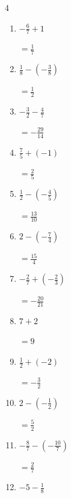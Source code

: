 \begin{multicols}{4}
\begin{enumerate}
        $\displaystyle =\frac{17}{10}$

  \item $\displaystyle -\frac{6}{7} + 1$

        $\displaystyle =\frac{1}{7}$

  \item $\displaystyle \frac{1}{8} - \left(-\frac{3}{8}\right)$

        $\displaystyle =\frac{1}{2}$

  \item $\displaystyle -\frac{3}{2} - \frac{4}{7}$

        $\displaystyle =-\frac{29}{14}$

  \item $\displaystyle \frac{7}{5} + \left(-1\right)$

        $\displaystyle =\frac{2}{5}$

  \item $\displaystyle \frac{1}{2} - \left(-\frac{4}{5}\right)$

        $\displaystyle =\frac{13}{10}$

  \item $\displaystyle 2 - \left(-\frac{7}{4}\right)$

        $\displaystyle =\frac{15}{4}$

  \item $\displaystyle -\frac{2}{7} + \left(-\frac{2}{3}\right)$

        $\displaystyle =-\frac{20}{21}$

\columnbreak %

  \item $\displaystyle 7 + 2$

        $\displaystyle =9$

  \item $\displaystyle \frac{1}{2} + \left(-2\right)$

        $\displaystyle =-\frac{3}{2}$

  \item $\displaystyle 2 - \left(-\frac{1}{2}\right)$

        $\displaystyle =\frac{5}{2}$

  \item $\displaystyle -\frac{8}{7} - \left(-\frac{10}{7}\right)$

        $\displaystyle =\frac{2}{7}$

  \item $\displaystyle -5 - \frac{1}{8}$


\end{enumerate}
\end{multicols}
